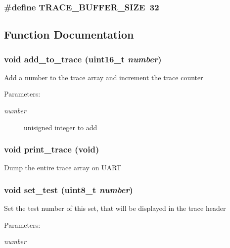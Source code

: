 \subsubsection{\setlength{\rightskip}{0pt plus 5cm}\#define TRACE\_\-BUFFER\_\-SIZE~32}\label{trace_8h_85f9a678e5f44d97a8a21adab8c065b7}




\subsection{Function Documentation}
\subsubsection{\setlength{\rightskip}{0pt plus 5cm}void add\_\-to\_\-trace (uint16\_\-t {\em number})}\label{trace_8h_fb273c7463f897628ae56507128a23f0}


Add a number to the trace array and increment the trace counter

\begin{Desc}
\item[Parameters:]
\begin{description}
\item[{\em number}]unisigned integer to add \end{description}
\end{Desc}
\subsubsection{\setlength{\rightskip}{0pt plus 5cm}void print\_\-trace (void)}\label{trace_8h_c8f0a211851c2ba508ca6f725085d72e}


Dump the entire trace array on UART 
\subsubsection{\setlength{\rightskip}{0pt plus 5cm}void set\_\-test (uint8\_\-t {\em number})}\label{trace_8h_979fdf811bf4b4501b9b9a7e90e2181c}


Set the test number of this set, that will be displayed in the trace header

\begin{Desc}
\item[Parameters:]
\begin{description}
\item[{\em number}]\end{description}
\end{Desc}
